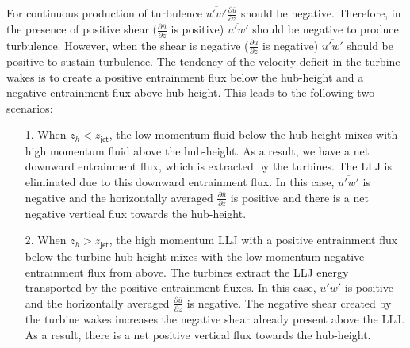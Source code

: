 \documentclass[%
 aip,
 amsmath,amssymb,
preprint,%
author-numerical,%
]{revtex4-1}
\begin{document}
For continuous production of turbulence $\overline{u'w'}\frac{\partial{\overline{u}}}{\partial{z}}$ should be negative. Therefore, in the presence of positive shear ($\frac{\partial{\overline{u}}}{\partial{z}}$ is positive) $\overline{u'w'}$ should be negative to produce turbulence. However, when the shear is negative ($\frac{\partial{\overline{u}}}{\partial{z}}$ is negative) $\overline{u'w'}$ should be positive to sustain turbulence. The tendency of the velocity deficit in the turbine wakes is to create a positive entrainment flux below the hub-height and a negative entrainment flux above hub-height. This leads to the following two scenarios: 
\begin{itemize}
 \item[1.] When $z_h < z_\mathsf{jet}$, the low momentum fluid below the hub-height mixes with high momentum fluid above the hub-height. As a result, we have a net downward entrainment flux, which is extracted by the turbines. The LLJ is eliminated due to this downward entrainment flux. 
 In this case, $\overline{u'w'}$ is negative and the horizontally averaged $\frac{\partial{\overline{u}}}{\partial{z}}$ is positive and there is a net negative vertical flux towards the hub-height.
 \item[2.] When $z_h > z_\mathsf{jet}$, the high momentum LLJ with a positive entrainment flux below the turbine hub-height mixes with the low momentum negative entrainment flux from above. The turbines extract the LLJ energy transported by the positive entrainment fluxes. 
 In this case, $\overline{u'w'}$ is positive and the horizontally averaged $\frac{\partial{\overline{u}}}{\partial{z}}$ is negative. The negative shear created by the turbine wakes increases the negative shear already present above the LLJ. As a result, there is a net positive vertical flux towards the hub-height. 
\end{itemize}
\end{document}
